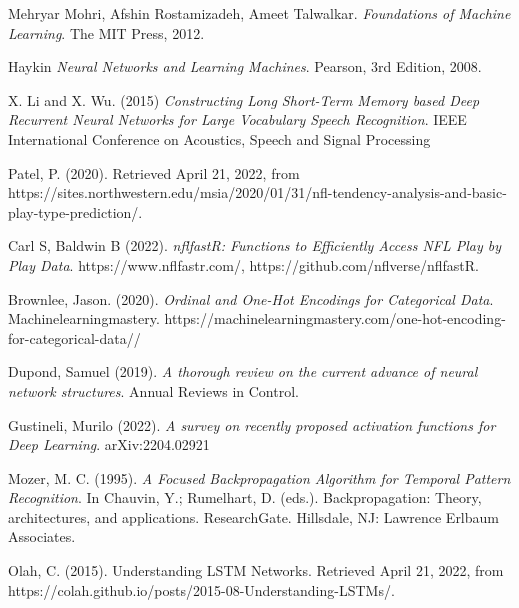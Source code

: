 \documentclass[11pt]{article}
\begin{document}
\begin{thebibliography}{999}

        Mehryar Mohri, Afshin Rostamizadeh, Ameet Talwalkar.
      \emph{Foundations of Machine Learning}.
      The MIT Press,
      2012.
      
      Haykin
    \emph{Neural Networks and Learning Machines}.
    Pearson, 3rd Edition,
    2008.

    X. Li and X. Wu. (2015)
    \emph{Constructing Long Short-Term Memory based Deep Recurrent Neural Networks for Large Vocabulary Speech Recognition}.
    IEEE International Conference on Acoustics, Speech and Signal Processing

    Patel, P. (2020). Retrieved April 21, 2022, from https://sites.northwestern.edu/msia/2020/01/31/nfl-tendency-analysis-and-basic-play-type-prediction/. 

    Carl S, Baldwin B (2022). \emph{nflfastR: Functions to Efficiently Access NFL Play by Play Data}. https://www.nflfastr.com/, https://github.com/nflverse/nflfastR.

    Brownlee, Jason. (2020). \emph{Ordinal and One-Hot Encodings for Categorical Data}. Machinelearningmastery. https://machinelearningmastery.com/one-hot-encoding-for-categorical-data//
    
    Dupond, Samuel (2019). \emph{A thorough review on the current advance of neural network structures}. Annual Reviews in Control.

    Gustineli, Murilo (2022). \emph{A survey on recently proposed activation functions for Deep Learning}. arXiv:2204.02921

    Mozer, M. C. (1995). \emph{A Focused Backpropagation Algorithm for Temporal Pattern Recognition}. In Chauvin, Y.; Rumelhart, D. (eds.). Backpropagation: Theory, architectures, and applications. ResearchGate. Hillsdale, NJ: Lawrence Erlbaum Associates.

    Olah, C. (2015). Understanding LSTM Networks. Retrieved April 21, 2022, from https://colah.github.io/posts/2015-08-Understanding-LSTMs/. 
    
\end{thebibliography}
\end{document}
